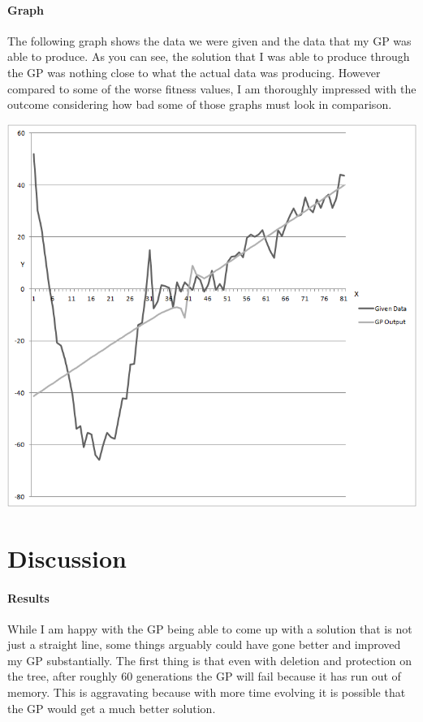 \documentclass[11pt]{article} %
\begin{document}
\paragraph{Graph} The following graph shows the data we were given and the data that my GP was able to produce. As you can see, the solution that I was able to produce through the GP was nothing close to what the actual data was producing. However compared to some of the worse fitness values, I am thoroughly impressed with the outcome considering how bad some of those graphs must look in comparison.

\begin{center}
\includegraphics[scale = 0.75]{Graph}
\end{center}
\pagebreak

\section{Discussion}

\paragraph{Results} While I am happy with the GP being able to come up with a solution that is not just a straight line, some things arguably could have gone better and improved my GP substantially. The first thing is that even with deletion and protection on the tree, after roughly 60 generations the GP will fail because it has run out of memory. This is aggravating because with more time evolving it is possible that the GP would get a much better solution.
\end{document}

